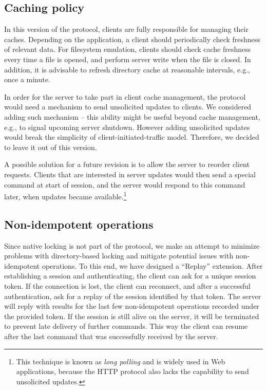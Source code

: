%

\subsection{Caching policy}

In this version of the protocol, clients are fully responsible for managing their caches.  Depending on the
application, a client should periodically check freshness of relevant data.  For filesystem emulation, clients
should check cache freshness every time a file is opened, and perform server write when the file is closed.
In addition, it is advisable to refresh directory cache at reasonable intervals, e.g., once a minute.

In order for the server to take part in client cache management, the protocol would need a mechanism to send
unsolicited updates to clients. We considered adding such mechanism -- this ability might be useful beyond
cache management, e.g., to signal upcoming server shutdown. However adding unsolicited updates would break the
simplicity of client-initiated-traffic model. Therefore, we decided to leave it out of this version.

A possible solution for a future revision is to allow the server to reorder client requests. Clients that are
interested in server updates would then send a special command at start of session, and the server would
respond to this command later, when updates became available.\footnote{This technique is known as {\it long
polling} and is widely used in Web applications, because the HTTP protocol also lacks the capability to send
unsolicited updates.}

%

\subsection{Non-idempotent operations}

Since native locking is not part of the protocol, we make an attempt to minimize problems with directory-based
locking and mitigate potential issues with non-idempotent operations. To this end, we have designed
a ``Replay'' extension. After establishing a session and authenticating, the client can ask for a unique
session token. If the connection is lost, the client can reconnect, and after a successful authentication, ask
for a replay of the session identified by that token. The server will reply with results for the last few
non-idempotent operations recorded under the provided token. If the session is still alive on the server, it
will be terminated to prevent late delivery of further commands. This way the client can resume after the last
command that was successfully received by the server.


